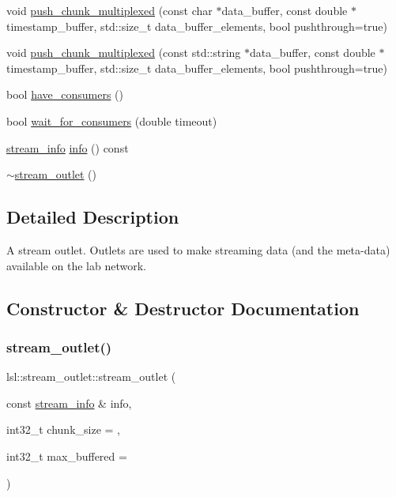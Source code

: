 \begin{DoxyCompactItemize}
\item 
void \hyperlink{classlsl_1_1stream__outlet_a6ff877ac1b4c96f38ac36a2319a874da}{push\+\_\+chunk\+\_\+multiplexed} (const char $\ast$data\+\_\+buffer, const double $\ast$timestamp\+\_\+buffer, std\+::size\+\_\+t data\+\_\+buffer\+\_\+elements, bool pushthrough=true)
\item 
void \hyperlink{classlsl_1_1stream__outlet_a17744ee6e963464fe6442d1e6f1a50f8}{push\+\_\+chunk\+\_\+multiplexed} (const std\+::string $\ast$data\+\_\+buffer, const double $\ast$timestamp\+\_\+buffer, std\+::size\+\_\+t data\+\_\+buffer\+\_\+elements, bool pushthrough=true)
\item 
bool \hyperlink{classlsl_1_1stream__outlet_a3e7fad1010ef7c78bcd006a4f94381fa}{have\+\_\+consumers} ()
\item 
bool \hyperlink{classlsl_1_1stream__outlet_af188fa767e2a70c402486b761e9869fe}{wait\+\_\+for\+\_\+consumers} (double timeout)
\item 
\hyperlink{classlsl_1_1stream__info}{stream\+\_\+info} \hyperlink{classlsl_1_1stream__outlet_af6fda8eb922b27ae3ed98651934243fe}{info} () const
\item 
\hyperlink{classlsl_1_1stream__outlet_aa8a10c88f57686d77bee002aff4c9d4e}{$\sim$stream\+\_\+outlet} ()
\end{DoxyCompactItemize}


\subsection{Detailed Description}
A stream outlet. Outlets are used to make streaming data (and the meta-\/data) available on the lab network. 

\subsection{Constructor \& Destructor Documentation}
\mbox{\label{classlsl_1_1stream__outlet_ac88c568fdc7429d95c51cd7b58d902cc}} 
\subsubsection{\texorpdfstring{stream\+\_\+outlet()}{stream\_outlet()}}
{\footnotesize\ttfamily lsl\+::stream\+\_\+outlet\+::stream\+\_\+outlet (\begin{DoxyParamCaption}\item[{const \hyperlink{classlsl_1_1stream__info}{stream\+\_\+info} \&}]{info,  }\item[{int32\+\_\+t}]{chunk\+\_\+size = {},  }\item[{int32\+\_\+t}]{max\+\_\+buffered = {} }\end{DoxyParamCaption})\hspace{0.3cm}{\ttfamily [inline]}}

